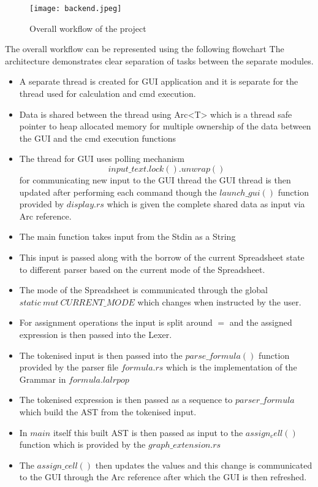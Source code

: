 \documentclass{article}
\begin{document}
\begin{itemize}
\begin{figure}[h!]
    \centering
    \texttt{[image: backend.jpeg]}
    \caption{Overall workflow of the project}
    \label{fig:my_image}
\end{figure}
The overall workflow can be represented using the following flowchart 
The architecture demonstrates clear separation of tasks between the separate modules.
\begin{itemize}
\item A separate thread is created for GUI application and it is separate for the thread used for calculation and cmd execution.
\item Data is shared between the thread using Arc<T> which is a thread safe pointer to heap allocated memory for multiple ownership of the data between the GUI and the cmd execution functions
\item The thread for GUI uses polling mechanism $$input\_text.lock().unwrap()$$ for communicating new input to the GUI thread the GUI thread is then updated after performing each command though the $launch\_gui()$ function provided by $display.rs$ which is given the complete shared data as input via Arc reference.
\item The main function takes input from the Stdin as a String
\item This input is passed along with the borrow of the current Spreadsheet state to different parser based on the current mode of the Spreadsheet.
\item The mode of the Spreadsheet is communicated through the global $static\ mut\ CURRENT\_MODE$ which changes when instructed by the user.
\item For assignment operations the input is split around $=$ and the assigned  expression  is then passed into the Lexer.
\item The tokenised input is then passed into the $parse\_formula()$ function provided by the parser file $formula.rs$ which is the implementation of the Grammar in $formula.lalrpop$
\item The tokenised expression is then passed as a sequence to $parser\_formula$ which build the AST from the tokenised input.
\item In $main$ itself this built AST is then passed as input to the $assign_cell()$ function which is provided by the $graph\_extension.rs$
\item The $assign\_cell()$  then updates the values and this change is communicated to the GUI through the Arc reference after which the GUI is then refreshed.

\end{itemize}
\end{itemize}
\end{document}
